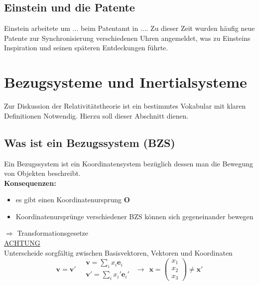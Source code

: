 \documentclass[titlepage,11pt,a4paper,ngerman]{report}
\renewcommand{\vec}[1]{\boldsymbol{#1}}
\begin{document}
\subsection{Einstein und die Patente}






Einstein arbeitete um ... beim Patentamt in .... Zu dieser Zeit wurden häufig neue Patente zur Synchronisierung verschiedenen Uhren angemeldet, was zu Einsteins Inspiration und seinen späteren Entdeckungen führte.

\section{Bezugsysteme und Inertialsysteme}

Zur Diskussion der Relativitätstheorie ist ein bestimmtes Vokabular mit klaren Definitionen Notwendig. Hierzu soll dieser Abschnitt dienen.

\subsection{Was ist ein Bezugssystem (BZS)}

Ein Bezugssystem ist ein Koordinatensystem bezüglich dessen man die Bewegung von Objekten beschreibt.\\
\textbf{Konsequenzen:}
\begin{itemize}
	\item es gibt einen Koordinatenursprung $ \vec{O} $
	\item Koordinatenursprünge verschiedener BZS können sich gegeneinander bewegen
\end{itemize}
$ \Rightarrow $ Transformationsgesetze\\[5pt]
\underline{ACHTUNG}\\
Unterscheide sorgfältig zwischen Basisvektoren, Vektoren und Koordinaten
\begin{equation*}
\vec{v} = \vec{v}' \quad \begin{array}{c}
\vec{v} = \sum_i x_i \vec{e}_i \\ \vec{v}' = \sum_i x_i' \vec{e}_i'
\end{array} \ \ \rightarrow \ \ \vec{x} = \begin{pmatrix}
x_1 \\ x_2 \\ x_3
\end{pmatrix} \neq \vec{x}'
\end{equation*}
\end{document}
